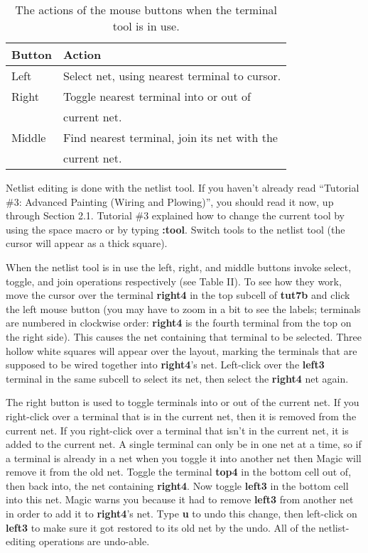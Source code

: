 \documentclass[letterpaper,twoside,12pt]{article}
\begin{document}
\begin{table}[ht]
   \begin{center}
      \begin{tabular}{|l|l|} \hline
	Button	& Action \\ \hline
	Left	& Select net, using nearest terminal to cursor. \\ \hline
	Right	& Toggle nearest terminal into or out of \\
		& current net. \\ \hline
	Middle	& Find nearest terminal, join its net with the \\
		& current net. \\ \hline
      \end{tabular}
      \caption{The actions of the mouse buttons when the terminal tool is in use.}
   \end{center}
\end{table}

Netlist editing is done with the netlist tool.  If you haven't
already read ``Tutorial \#3: Advanced Painting (Wiring and Plowing)'',
you should read it now, up through Section 2.1.  Tutorial \#3
explained how to change the current tool by using the space macro
or by typing {\bfseries :tool}.  Switch tools to the netlist tool (the
cursor will appear as a thick square).

When the netlist tool is in use the left, right, and middle
buttons invoke select, toggle, and join operations respectively
(see Table II).
To see how they work, move the cursor over the terminal
{\bfseries right4} in the top subcell of {\bfseries tut7b} and click
the left mouse button (you may have to zoom in a bit to see the
labels;  terminals are numbered in clockwise order:  {\bfseries right4}
is the fourth terminal from the top on the right side).  This
causes the net containing that
terminal to be selected.  Three hollow white squares will appear
over the layout, marking the terminals that are supposed
to be wired together into {\bfseries right4}'s net.  Left-click
over the {\bfseries left3} terminal in the same subcell to select its net,
then select the {\bfseries right4} net again.

The right button is used to toggle terminals into or out of the
current net.  If you right-click over a terminal that is in the
current net, then it is removed from the current net.  If you
right-click over a terminal that isn't in the current net, it
is added to the current net.  A single terminal can only be in
one net at a time, so if a terminal is already in a net when
you toggle it into another net then Magic will
remove it from the old net.  Toggle the terminal {\bfseries top4}
in the bottom cell out of, then back into, the net containing
{\bfseries right4}.  Now toggle {\bfseries left3} in the bottom cell
into this net.  Magic warns you because it had to remove {\bfseries left3}
from another net in order to add it to {\bfseries right4}'s net.  Type
{\bfseries u} to undo this change, then left-click on {\bfseries left3} to
make sure it got restored to its old net by the undo.  All of
the netlist-editing operations are undo-able.
\end{document}
